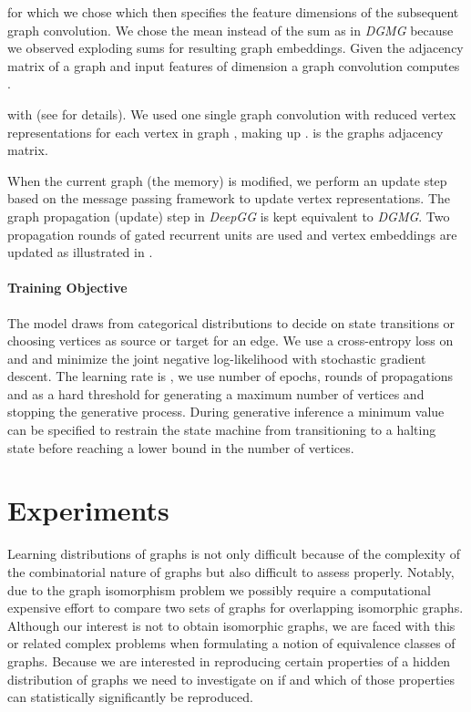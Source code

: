 \documentclass{article}
\begin{document}
for which we chose  which then specifies the feature dimensions of the subsequent graph convolution.
We chose the mean instead of the sum as in \textit{DGMG} because we observed exploding sums for resulting graph embeddings.
Given the adjacency matrix  of a graph and input features of dimension  a graph convolution computes .

with  (see \cite{kipf2016semi} for details).
We used one single graph convolution  with reduced vertex representations for each vertex in graph , making up .
 is the graphs adjacency matrix.

When the current graph  (the memory) is modified, we perform an update step based on the message passing framework \cite{gilmer2017neural} to update vertex representations.
The graph propagation (update) step in \textit{DeepGG} is kept equivalent to \textit{DGMG}.
Two propagation rounds  of gated recurrent units are used and vertex embeddings are updated as illustrated in \cite[figure 2]{li2018learning}.


\paragraph{Training Objective} The model draws from categorical distributions to decide on state transitions or choosing vertices as source or target for an edge.
We use a cross-entropy loss on  and  and minimize the joint negative log-likelihood with stochastic gradient descent.
The learning rate is , we use  number of epochs,  rounds of propagations and  as a hard threshold for generating a maximum number of vertices and stopping the generative process.
During generative inference a minimum value  can be specified to restrain the state machine from transitioning to a halting state before reaching a lower bound in the number of vertices.

 \section{Experiments}\label{sec:experiments}
Learning distributions of graphs is not only difficult because of the complexity of the combinatorial nature of graphs but also difficult to assess properly.
Notably, due to the graph isomorphism problem we possibly require a computational expensive effort to compare two sets of graphs for overlapping isomorphic graphs.
Although our interest is not to obtain isomorphic graphs, we are faced with this or related complex problems when formulating a notion of equivalence classes of graphs.
Because we are interested in reproducing certain properties of a hidden distribution of graphs we need to investigate on if and which of those properties can statistically significantly be reproduced.
\end{document}
